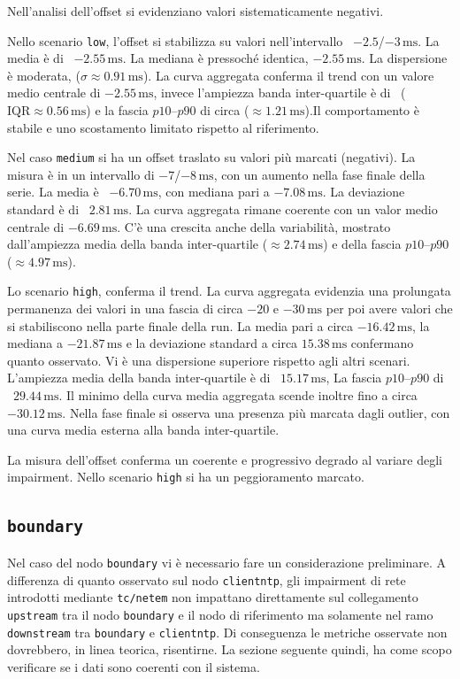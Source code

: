 Nell'analisi dell'offset si evidenziano valori sistematicamente negativi.

Nello scenario \texttt{low}, l'offset si stabilizza su valori nell'intervallo ~$-
2.5$/$-3\,\mathrm{ms}$. La media è di ~$-2.55\,\mathrm{ms}$. La mediana è
pressoché identica, $-2 .55\,\mathrm{ms}$. La dispersione è moderata, ($\sigma \approx
0.91\,\mathrm{ms}$). La curva aggregata conferma il trend con un valore medio
centrale di $-2.55\,\mathrm{ms}$, invece l'ampiezza banda inter-quartile è di ~($\mathrm{IQR}
\approx 0.56\,\mathrm{ms}$) e la fascia $p10$--$p 90$ di circa ($\approx 1.21\,\mathrm{ms}$).Il
comportamento è stabile e uno scostamento limitato rispetto al riferimento.

Nel caso \texttt{medium} si ha un offset traslato su valori più marcati (negativi).
La misura è in un intervallo di $-7$/$-8\,\mathrm{ms}$, con un aumento nella
fase finale della serie. La media è ~$-6.70\,\mathrm{ms}$, con mediana pari a $-7
.08\,\mathrm{ms}$. La deviazione standard è di ~$2.81\,\mathrm{ms}$. La curva
aggregata rimane coerente con un valor medio centrale di $-6.69\,\mathrm{ms}$. C'è
una crescita anche della variabilità, mostrato dall'ampiezza media della banda
inter-quartile ($\approx 2.74\,\mathrm{ms}$) e della fascia $p10$--$p90$ ($\approx
4.97\,\mathrm{ms}$).

Lo scenario \texttt{high}, conferma il trend. La curva aggregata evidenzia una
prolungata permanenza dei valori in una fascia di circa $-20$ e
$-30\,\mathrm{ms}$ per poi avere valori che si stabiliscono nella parte finale
della run. La media pari a circa $-16.42\,\mathrm{ms}$, la mediana a
$-21.87\,\mathrm{ms}$ e la deviazione standard a circa $15.38\,\mathrm{ms}$
confermano quanto osservato. Vi è una dispersione superiore rispetto agli altri scenari.
L'ampiezza media della banda inter-quartile è di ~$15 .17\,\mathrm{ms}$, La
fascia $p10$--$p90$ di ~$29.44\, \mathrm{ms}$. Il minimo della curva media aggregata
scende inoltre fino a circa $-30.12\,\mathrm{ms}$.
Nella fase finale si osserva una presenza più marcata dagli outlier, con una curva media
esterna alla banda inter-quartile.

La misura dell'offset conferma un coerente e progressivo degrado al variare degli
impairment. Nello scenario \texttt{high} si ha un peggioramento marcato.

\subsection{\texttt{boundary}}
Nel caso del nodo \texttt{boundary} vi è necessario fare un considerazione
preliminare. A differenza di quanto osservato sul nodo \texttt{clientntp}, gli impairment
di rete introdotti mediante \texttt{tc/netem} non impattano direttamente sul
collegamento \texttt{upstream} tra il nodo \texttt{boundary} e il nodo di
riferimento ma solamente nel ramo \texttt{downstream} tra \texttt{boundary} e
\texttt{clientntp}. Di conseguenza le metriche osservate non dovrebbero, in linea
teorica, risentirne. La sezione seguente quindi, ha come scopo verificare se i
dati sono coerenti con il sistema.

